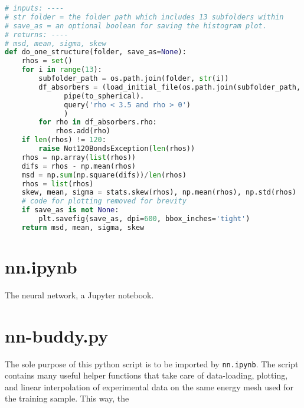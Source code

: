 \begin{lstlisting}[language=Python]
# inputs: ----
# str folder = the folder path which includes 13 subfolders within
# save_as = an optional boolean for saving the histogram plot.
# returns: ----
# msd, mean, sigma, skew
def do_one_structure(folder, save_as=None):
    rhos = set()
    for i in range(13):
        subfolder_path = os.path.join(folder, str(i))
        df_absorbers = (load_initial_file(os.path.join(subfolder_path, 'feff.inp')).
              pipe(to_spherical).
              query('rho < 3.5 and rho > 0')
              )
        for rho in df_absorbers.rho:
            rhos.add(rho)
    if len(rhos) != 120:
        raise Not120BondsException(len(rhos))
    rhos = np.array(list(rhos))
    difs = rhos - np.mean(rhos)
    msd = np.sum(np.square(difs))/len(rhos)
    rhos = list(rhos)
    skew, mean, sigma = stats.skew(rhos), np.mean(rhos), np.std(rhos)
    # code for plotting removed for brevity
    if save_as is not None:
        plt.savefig(save_as, dpi=600, bbox_inches='tight')
    return msd, mean, sigma, skew
\end{lstlisting}


\section{nn.ipynb}
The neural network, a Jupyter notebook.

\section{nn-buddy.py}
The sole purpose of this python script is to be imported by \texttt{nn.ipynb}. The script contains many useful helper functions that take care of data-loading, plotting, and linear interpolation of experimental data on the same energy mesh used for the training sample. This way, the 
